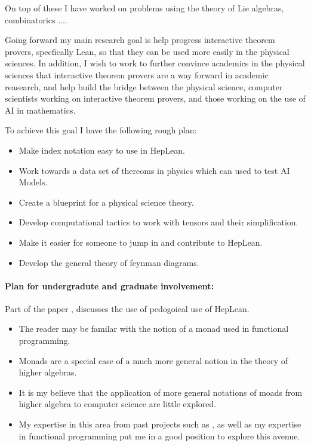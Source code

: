 \documentclass[14pt,letter]{article}
\newcounter{customtitle}
\begin{document}
On top of these I have worked on problems using the theory of Lie algebras,
combinatorics .... 



Going forward my main research goal is help progress interactive theorem provers, 
specfically Lean,
so that they can be used more easily in the physical sciences. 
In addition, I wish to work to further convince academics in the physical sciences 
that interactive theorem provers are a way forward in academic reasearch, and 
help build the bridge between the physical science, computer scientists 
working on interactive theorem provers, and those working on 
the use of AI in mathematics. 

To achieve this goal I have the following rough plan:

\begin{itemize}
\item Make index notation easy to use in HepLean.
\item Work towards a data set of thereoms in physics which can used 
to test AI Models. 
\item Create a blueprint for a physical science theory.
\item  Develop computational tactics to work with tensors
and their simplification. 
\item Make it easier for someone to jump in and contribute 
to HepLean.
\item Develop the general theory of feynman diagrams. 
\end{itemize}

\paragraph{Plan for undergradute and graduate involvement:} Part of the paper , discusses the use of pedogoical use 
of HepLean.   


\begin{itemize}
\item The reader may be familar with the notion of a monad used in functional programming.
\item Monads are a special case of a much more general notion in the theory of higher algebras. 
\item It is my believe that the application of more general notations of moads from higher algebra to computer science 
are little explored. 
\item My expertise in this area from past projects such as , as well as my expertise in functional programming
 put me in a good position to explore this avenue.
\end{itemize}
\end{document}
